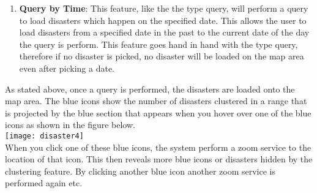\begin{enumerate}
\begin{enumerate}
		\item \textbf{Query by Time}: This feature, like the the type query, will perform a query to load disasters which happen on the specified date. This allows the user to load disasters from a specified date in the past to the current date of the day the query is perform. This feature goes hand in hand with the type query, therefore if no disaster is picked, no disaster will be loaded  on the map area even after picking a date.
		\end{enumerate}
		As stated above, once a query is performed, the disasters are loaded onto the map area. The blue icons show the number of disasters clustered in a range that is projected by the blue section that appears when you hover over one of the blue icons as shown in the figure below. \\[0.2cm]
		\texttt{[image: disaster4]} \\[0.5cm]
		When you click one of these blue icons, the system perform a zoom service to the location of that icon. This then reveals more blue icons or disasters hidden by the clustering feature. By clicking another blue icon another zoom service is performed again etc.
	\end{enumerate}
